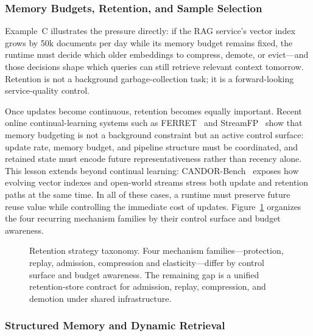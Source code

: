 \documentclass[acmsmall,screen,review]{acmart}
\begin{document}
\subsubsection{Memory Budgets, Retention, and Sample Selection}

Example~C illustrates the pressure directly: if the RAG service's vector index grows by 50k documents per day while its memory budget remains fixed, the runtime must decide which older embeddings to compress, demote, or evict---and those decisions shape which queries can still retrieve relevant context tomorrow. Retention is not a background garbage-collection task; it is a forward-looking service-quality control.

Once updates become continuous, retention becomes equally important. Recent online continual-learning systems such as FERRET~\cite{zhou2025ferret} and StreamFP~\cite{li2026streamfp} show that memory budgeting is not a background constraint but an active control surface: update rate, memory budget, and pipeline structure must be coordinated, and retained state must encode future representativeness rather than recency alone. This lesson extends beyond continual learning: CANDOR-Bench~\cite{wang2026candor} exposes how evolving vector indexes and open-world streams stress both update and retention paths at the same time. In all of these cases, a runtime must preserve future reuse value while controlling the immediate cost of updates. Figure~\ref{fig:retention-taxonomy} organizes the four recurring mechanism families by their control surface and budget awareness.

\begin{figure}[t]
\centering
\resizebox{0.90\textwidth}{!}{}
\caption{Retention strategy taxonomy. Four mechanism families---protection, replay, admission, compression and elasticity---differ by control surface and budget awareness. The remaining gap is a unified retention-store contract for admission, replay, compression, and demotion under shared infrastructure.}
\label{fig:retention-taxonomy}
\end{figure}

\subsubsection{Structured Memory and Dynamic Retrieval}
\end{document}
